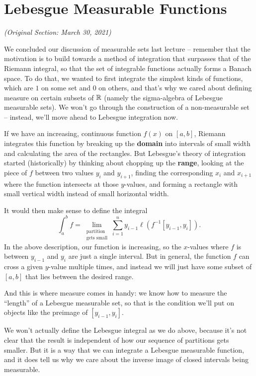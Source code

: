 \pagebreak\section{Lebesgue Measurable Functions}

\textit{(Original Section: March 30, 2021)}

We concluded our discussion of measurable sets last lecture -- remember that the motivation is to build towards a method of integration that surpasses that of the Riemann integral, so that the set of integrable functions actually forms a Banach space. To do that, we wanted to first integrate the simplest kinds of functions, which are $1$ on some set and $0$ on others, and that's why we cared about defining measure on certain subsets of $\mathbb R$ (namely the sigma-algebra of Lebesgue measurable sets). We won't go through the construction of a non-measurable set -- instead, we'll move ahead to Lebesgue integration now. 

\begin{fact}[Informal]
If we have an increasing, continuous function $f(x)$ on $[a, b]$, Riemann integrates this function by breaking up the \textbf{domain} into intervals of small width and calculating the area of the rectangles. But Lebesgue's theory of integration started (historically) by thinking about chopping up the \textbf{range}, looking at the piece of $f$ between two values $y_i$ and $y_{i+1}$, finding the corresponding $x_i$ and $x_{i+1}$ where the function intersects at those $y$-values, and forming a rectangle with small vertical width instead of small horizontal width. 
\end{fact}

It would then make sense to define the integral
\[
    \int_a^b f = \lim_{\substack{\text{partition} \\ \text{gets small}}} \sum_{i=1}^n y_{i-1} \ell(f^{-1}[y_{i-1}, y_i]).
\]
In the above description, our function is increasing, so the $x$-values where $f$ is between $y_{i-1}$ and $y_i$ are just a single interval. But in general, the function $f$ can cross a given $y$-value multiple times, and instead we will just have some subset of $[a, b]$ that lies between the desired range. 

And this is where measure comes in handy: we know how to measure the ``length'' of a Lebesgue measurable set, so that is the condition we'll put on objects like the preimage of $[y_{i-1}, y_i]$. 

We won't actually define the Lebesgue integral as we do above, because it's not clear that the result is independent of how our sequence of partitions gets smaller. But it is a way that we can integrate a Lebesgue measurable function, and it does tell us why we care about the inverse image of closed intervals being measurable. 


